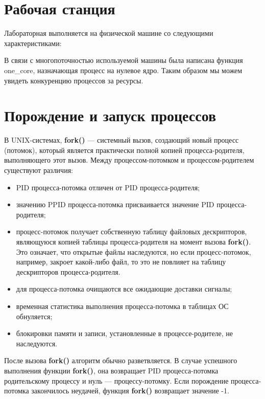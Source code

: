 \documentclass[a4paper]{article}
\begin{document}
\section{Рабочая станция}
	Лабораторная выполняется на физической машине со следующими характеристиками:
	
	
	В связи с многопоточностью используемой машины была написана функция one\_core, назначающая процесс на нулевое ядро. Таким образом мы можем увидеть конкуренцию процессов за ресурсы.
	
	
	
	
	
\section{Порождение и запуск процессов}
	В UNIX-системах, \textbf{fork()} --- системный вызов, создающий новый процесс (потомок), который является практически полной копией процесса-родителя, выполняющего этот вызов. Между процессом-потомком и процессом-родителем существуют различия:
	\begin{itemize}
		\item PID процесса-потомка отличен от PID процесса-родителя;
		\item значению PPID процесса-потомка присваивается значение PID процесса-родителя;
		\item процесс-потомок получает собственную таблицу файловых дескрипторов, являющуюся копией таблицы процесса-родителя на момент вызова \textbf{fork()}. Это означает, что открытые файлы наследуются, но если процесс-потомок, например, закроет какой-либо файл, то это не повлияет на таблицу дескрипторов процесса-родителя.
		\item для процесса-потомка очищаются все ожидающие доставки сигналы;
		\item временная статистика выполнения процесса-потомка в таблицах ОС обнуляется;
		\item блокировки памяти и записи, установленные в процессе-родителе, не наследуются.	
	\end{itemize}
	
	После вызова \textbf{fork()} алгоритм обычно разветвляется. В случае успешного выполнения функции \textbf{fork()}, она возвращает PID процесса-потомка родительскому процессу и нуль --- процессу-потомку. Если порождение процесса-потомка закончилось неудачей, функция \textbf{fork()} возвращает значение -1.
	
\end{document}
